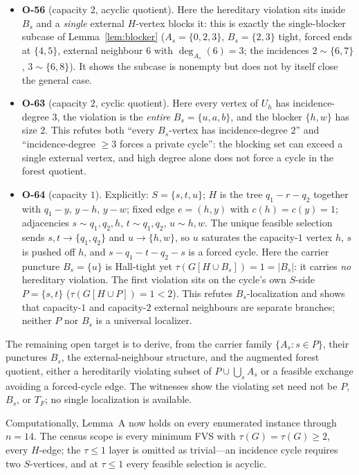 \documentclass[11pt]{article}
\theoremstyle{plain}
\theoremstyle{definition}
\newcommand{\FVS}{\tau}
\begin{document}
\begin{itemize}
\item \textbf{O-56} (capacity $2$, acyclic quotient). Here the hereditary
violation sits inside $B_s$ and a \emph{single} external $H$-vertex blocks it:
this is exactly the single-blocker subcase of Lemma~\ref{lem:blocker}
($A_s=\{0,2,3\}$, $B_s=\{2,3\}$ tight, forced ends at $\{4,5\}$, external
neighbour $6$ with $\deg_{A_s}(6)=3$; the incidences $2\!\sim\!\{6,7\}$,
$3\!\sim\!\{6,8\}$). It shows the subcase is nonempty but does not by itself close
the general case.
\item \textbf{O-63} (capacity $2$, cyclic quotient). Here every vertex of $U_h$
has incidence-degree $3$, the violation is the \emph{entire} $B_s=\{u,a,b\}$, and
the blocker $\{h,w\}$ has size $2$. This refutes both ``every $B_s$-vertex has
incidence-degree $2$'' and ``incidence-degree $\ge3$ forces a private cycle'':
the blocking set can exceed a single external vertex, and high degree alone does
not force a cycle in the forest quotient.
\item \textbf{O-64} (capacity $1$). Explicitly: $S=\{s,t,u\}$; $H$ is the tree
$q_1\!-\!r\!-\!q_2$ together with $q_1\!-\!y$, $y\!-\!h$, $y\!-\!w$; fixed edge
$e=(h,y)$ with $c(h)=c(y)=1$; adjacencies $s\!\sim\!q_1,q_2,h$, $t\!\sim\!q_1,q_2$,
$u\!\sim\!h,w$. The unique feasible selection sends $s,t\to\{q_1,q_2\}$ and
$u\to\{h,w\}$, so $u$ saturates the capacity-$1$ vertex $h$, $s$ is pushed off
$h$, and $s\!-\!q_1\!-\!t\!-\!q_2\!-\!s$ is a forced cycle. Here the carrier
puncture $B_s=\{u\}$ is Hall-tight yet $\FVS(G[H\cup B_s])=1=|B_s|$: it carries
\emph{no} hereditary violation. The first violation sits on the cycle's own
$S$-side $P=\{s,t\}$ ($\FVS(G[H\cup P])=1<2$). This refutes $B_s$-localization
and shows that capacity-$1$ and capacity-$2$ external neighbours are separate
branches; neither $P$ nor $B_s$ is a universal localizer.
\end{itemize}

The remaining open target is to derive, from the carrier family
$\{A_s:s\in P\}$, their punctures $B_s$, the external-neighbour structure, and the
augmented forest quotient, either a hereditarily violating subset of
$P\cup\bigcup_sA_s$ or a feasible exchange avoiding a forced-cycle edge. The
witnesses show the violating set need not be $P$, $B_s$, or $T_F$; no single
localization is available.

Computationally, Lemma~A now holds on every enumerated instance through
$n=14$.  The census scope is every minimum FVS with
$\tau(G)=\FVS(G)\ge2$, every $H$-edge; the $\tau\le1$ layer is omitted as
trivial---an incidence cycle requires two $S$-vertices, and at $\tau\le1$ every
feasible selection is acyclic.
\end{document}
